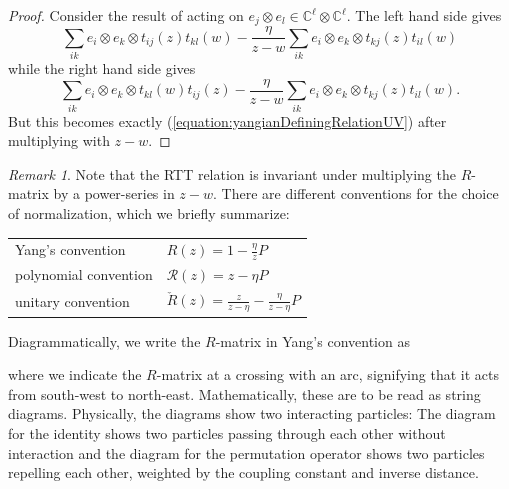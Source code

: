 \documentclass[11pt]{report}
\theoremstyle{definition}
\theoremstyle{remark}
\newtheorem*{remark}{Remark}
\theoremstyle{remark}
\newcommand{\C}{\mathbb{C}}
\begin{document}
\begin{proof}
Consider the result of acting on $e_j \otimes e_l \in \C^\ell \otimes \C^\ell$. The left hand side gives
\begin{equation*}
\sum_{ik} e_i \otimes e_k \otimes t_{ij}(z) t_{kl}(w) - \frac{\eta}{z-w} \sum_{ik} e_i \otimes e_k \otimes t_{kj}(z) t_{il}(w)
\end{equation*}
while the right hand side gives
\begin{equation*}
\sum_{ik} e_i \otimes e_k \otimes t_{kl}(w) t_{ij}(z) - \frac{\eta}{z-w} \sum_{ik} e_i \otimes e_k \otimes t_{kj}(z) t_{il}(w).
\end{equation*}
But this becomes exactly (\ref{equation:yangianDefiningRelationUV}) after multiplying with $z-w$.
\end{proof}

\begin{remark}
Note that the RTT relation is invariant under multiplying the $R$-matrix by a power-series in $z-w$. There are different conventions for the choice of normalization, which we briefly summarize:
\begin{center}
\begin{tabular}{|l||l|}
\hline
Yang's convention & $R(z) = 1 - \frac{\eta}{z} P$ \\
polynomial convention & $\mathcal{R}(z) = z - \eta P$ \\
unitary convention & $\check R(z) = \frac{z}{z-\eta} - \frac{\eta}{z-\eta} P$ \\
\hline
\end{tabular}
\end{center}
Diagrammatically, we write the $R$-matrix in Yang's convention as
~\\
\begin{center}
\end{center}
where we indicate the $R$-matrix at a crossing with an arc, signifying that it acts from south-west to north-east. Mathematically, these are to be read as string diagrams. Physically, the diagrams show two interacting particles: The diagram for the identity shows two particles passing through each other without interaction and the diagram for the permutation operator shows two particles repelling each other, weighted by the coupling constant and inverse distance.


\end{remark}
\end{document}
